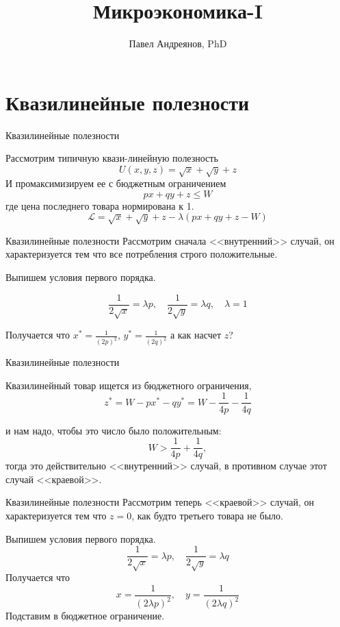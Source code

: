\documentclass{beamer}
\title{
Микроэкономика-I
}
\author{
Павел Андреянов, PhD
}
\begin{document}
\maketitle

\section{Квазилинейные полезности}
\begin{frame}{Квазилинейные полезности}
	
Рассмотрим типичную квази-линейную полезность
$$ U(x,y,z) = \sqrt{x} + \sqrt{y} + z$$
И промаксимизируем ее с бюджетным ограничением
$$ px + qy + z \leqslant W$$
где цена последнего товара нормирована к 1.
$$ \mathcal{L} = \sqrt{x} + \sqrt{y} + z - \lambda (px + qy + z - W)$$
\end{frame}

\begin{frame}{Квазилинейные полезности}
Рассмотрим сначала <<внутренний>> случай, он характеризуется тем что все потребления строго положительные.

Выпишем условия первого порядка.

$$ \frac{1}{2\sqrt{x}} = \lambda p, \quad \frac{1}{2\sqrt{y}} = \lambda q, \quad \lambda = 1$$

Получается что $x^* = \frac{1}{(2p)^2}$, $y^* = \frac{1}{(2q)^2}$ а как насчет $z$?
	
\end{frame}

\begin{frame}{Квазилинейные полезности}

Квазилинейный товар ищется из бюджетного ограничения,
$$z^* = W - px^*-qy^*= W - \frac{1}{4p} - \frac{1}{4q}$$

и нам надо, чтобы это число было положительным:
$$ W > \frac{1}{4p} + \frac{1}{4q},$$
тогда это действительно <<внутренний>> случай, в противном случае этот случай <<краевой>>.
	
\end{frame}

\begin{frame}{Квазилинейные полезности}
Рассмотрим теперь <<краевой>> случай, он характеризуется тем что $z = 0$, как будто третьего товара не было.

Выпишем условия первого порядка.
$$ \frac{1}{2\sqrt{x}} = \lambda p, \quad \frac{1}{2\sqrt{y}} = \lambda q$$
Получается что 
$$x = \frac{1}{(2 \lambda p)^2}, \quad y = \frac{1}{(2 \lambda q)^2}$$
Подставим в бюджетное ограничение.
\end{frame}
\end{document}
